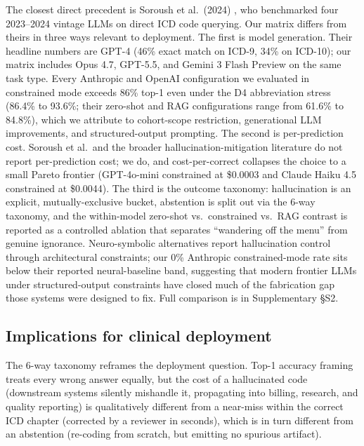 The closest direct precedent is Soroush et al.~(2024)
\autocite{Soroush2024}, who benchmarked four 2023--2024 vintage
LLMs on direct ICD code querying. Our matrix differs from theirs in
three ways relevant to deployment. The first is model generation.
Their headline numbers are GPT-4 (46\% exact match on ICD-9, 34\%
on ICD-10); our matrix includes Opus 4.7, GPT-5.5, and Gemini 3
Flash Preview on the same task type. Every Anthropic and OpenAI
configuration we evaluated in constrained mode exceeds 86\% top-1
even under the D4 abbreviation stress (86.4\% to 93.6\%; their
zero-shot and RAG configurations range from 61.6\% to 84.8\%),
which we attribute to cohort-scope
restriction, generational LLM improvements, and structured-output
prompting. The second is per-prediction cost. Soroush et al.\ and
the broader hallucination-mitigation literature
\autocite{DasBaksi2024,Sarvari2025,Motzfeldt2025,HybridCode2025} do
not report per-prediction cost; we do, and cost-per-correct
collapses the choice to a small Pareto frontier (GPT-4o-mini
constrained at \$0.0003 and Claude Haiku 4.5 constrained at
\$0.0044). The third is the outcome taxonomy: hallucination is an
explicit, mutually-exclusive bucket, abstention is split out via
the 6-way taxonomy, and the within-model zero-shot vs.\ constrained
vs.\ RAG contrast is reported as a controlled ablation that
separates ``wandering off the menu'' from genuine ignorance.
Neuro-symbolic alternatives \autocite{Motzfeldt2025,HybridCode2025}
report hallucination control through architectural constraints;
our 0\% Anthropic constrained-mode rate sits below their reported
neural-baseline band, suggesting that modern frontier LLMs under
structured-output constraints have closed much of the fabrication
gap those systems were designed to fix. Full comparison is in
Supplementary §S2.

\subsection{Implications for clinical deployment}\label{implications-for-clinical-deployment}

The 6-way taxonomy reframes the deployment question. Top-1
accuracy framing treats every wrong answer equally, but the cost
of a hallucinated code (downstream systems silently mishandle it,
propagating into billing, research, and quality reporting) is
qualitatively different from a near-miss within the correct ICD
chapter (corrected by a reviewer in seconds), which is in turn
different from an abstention (re-coding from scratch, but
emitting no spurious artifact).

